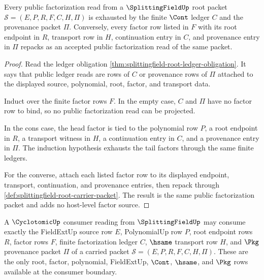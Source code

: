 \begin{theorem}
\label{thm:splittingfield-root-factor-ledger-exhaustion}
Every public factorization read from a $\SplittingFieldUp$ root packet
$\mathcal{S}=(E,P,R,F,C,H,\Pi)$ is exhausted by the finite $\Cont$ ledger $C$
and the provenance packet $\Pi$. Conversely, every factor row listed in $F$
with its root endpoint in $R$, transport row in $H$, continuation entry in
$C$, and provenance entry in $\Pi$ repacks as an accepted public factorization
read of the same packet.
\end{theorem}
\begin{proof}
Read the ledger obligation
\autoref{thm:splittingfield-root-ledger-obligation}. It says that public ledger
reads are rows of $C$ or provenance rows of $\Pi$ attached to the displayed
source, polynomial, root, factor, and transport data.

Induct over the finite factor rows $F$. In the empty case, $C$ and $\Pi$ have
no factor row to bind, so no public factorization read can be projected.

In the cons case, the head factor is tied to the polynomial row $P$, a root
endpoint in $R$, a transport witness in $H$, a continuation entry in $C$, and a
provenance entry in $\Pi$. The induction hypothesis exhausts the tail factors
through the same finite ledgers.

For the converse, attach each listed factor row to its displayed endpoint,
transport, continuation, and provenance entries, then repack through
\autoref{def:splittingfield-root-carrier-packet}. The result is the same
public factorization packet and adds no host-level factor source.
\end{proof}
\begin{theorem}
\label{thm:splittingfield-cyclotomic-consumer-source-boundary}
A $\CyclotomicUp$ consumer reading from $\SplittingFieldUp$ may consume exactly
the FieldExtUp source row $E$, PolynomialUp row $P$, root endpoint rows $R$,
factor rows $F$, finite factorization ledger $C$, $\hsame$ transport row $H$,
and $\Pkg$ provenance packet $\Pi$ of a carried packet
$\mathcal{S}=(E,P,R,F,C,H,\Pi)$. These are the only root, factor, polynomial,
FieldExtUp, $\Cont$, $\hsame$, and $\Pkg$ rows available at the consumer
boundary.
\end{theorem}
